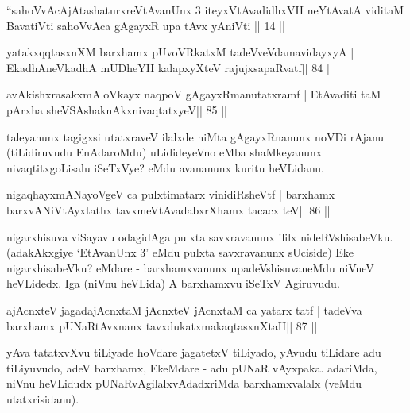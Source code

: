 
\begin{kandikeshl}
``sahoVvAcAjAtashaturxreVtAvanUnx 3 iteyxVtAvadidhxVH
neYtAvatA viditaM BavatiVti sahoVvAca gAgayxR
upa tAvx yAniVti || 14 ||
\end{kandikeshl}

\begin{shl}
yatakxqqtasxnXM barxhamx pUvoVRkatxM tadeVveVdamavidayxyA |
EkadhA\s neVkadhA mUDheYH kalapxyXteV rajujxsapaRvatf\hfill || 84 ||
\end{shl}

\begin{shl}
avAkishxrasakxmAloVkayx naqpoV gAgayxRmanutatxramf |
EtAvaditi taM pArxha sheVSAshaknAkxnivaqtatxyeV\hfill || 85 ||
\end{shl}

\begin{artha}
taleyanunx tagigxsi utatxraveV ilalxde niMta gAgayxRnanunx noVDi rAjanu (tiLidiruvudu EnAdaroMdu) uLidideyeVno eMba shaMkeyanunx nivaqtitxgoLisalu iSeTxVye? eMdu avananunx kuritu heVLidanu.
\end{artha} 

\begin{shl}
nigaqhayxmANayoVgeV ca pulxtimatarx vinidiRsheVtf |
barxhamx barxvANiVtAyxtathx tavxmeVtAvadabxrXhamx tacacx teV\hfill || 86 ||
\end{shl}

\begin{artha}
nigarxhisuva viSayavu odagidAga pulxta savxravanunx ililx  nideRVshisabeVku. (adakAkxgiye `EtAvanUnx 3' eMdu pulxta savxravanunx  sUciside) Eke nigarxhisabeVku? eMdare - barxhamxvanunx upadeVshisuvaneMdu niVneV heVLidedx. Iga (niVnu heVLida) A barxhamxvu iSeTxV Agiruvudu.
\end{artha}


\begin{shl}
ajAcnxteV jagadajAcnxtaM jAcnxteV jAcnxtaM ca yatarx tatf |
tadeVva barxhamx pUNaRtAvxnanx tavxdukatxmakaqtasxnXtaH\hfill || 87 ||
\end{shl}

\begin{artha}
yAva tatatxvXvu tiLiyade hoVdare jagatetxV tiLiyado, yAvudu tiLidare adu  tiLiyuvudo, adeV barxhamx, EkeMdare - adu pUNaR vAyxpaka. adariMda, niVnu heVLidudx pUNaRvAgilalxvAdadxriMda barxhamxvalalx (veMdu utatxrisidanu).
\end{artha}


